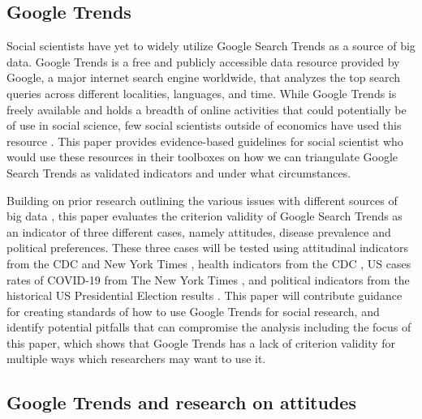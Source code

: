 \subsection{Google Trends}

Social scientists have yet to widely utilize Google Search Trends as a source of
big data. Google Trends is a free and publicly accessible data resource provided
by Google, a major internet search engine worldwide, that analyzes the top
search queries across different localities, languages, and time. While Google
Trends is freely available and holds a breadth of online activities that could
potentially be of use in social science, few social scientists outside of
economics have used this resource \citep[see][for examples]{choi2012predicting,
jun2018ten,da2011search}. This paper provides evidence-based guidelines for
social scientist who would use these resources in their toolboxes on how we can
triangulate Google Search Trends as validated indicators and under what
circumstances.

Building on prior research outlining the various issues with different sources
of big data \citep{boydCriticalQuestionsBig2012,lazerIssuesConstructValidity2015}, this
paper evaluates the criterion validity of Google Search Trends as an indicator
of three different cases, namely attitudes, disease prevalence and political
preferences. These three cases will be tested using attitudinal indicators from
the CDC \citeyearpar{vaches_data} and New York Times \citeyearpar{mask_data}, 
health indicators from the CDC
\citeyearpar{suic_data}, US cases rates of COVID-19 from The New York Times
\citeyearpar{covid_data}, and political indicators from the historical US
Presidential Election results \citeyearpar{pres_data}. 
This paper will contribute
guidance for creating standards of how to use Google Trends for social research,
and identify potential pitfalls that can compromise the analysis including the
focus of this paper, which shows that Google Trends has a lack of criterion validity
for multiple ways which researchers may want to use it.


\subsection{Google Trends and research on attitudes}


